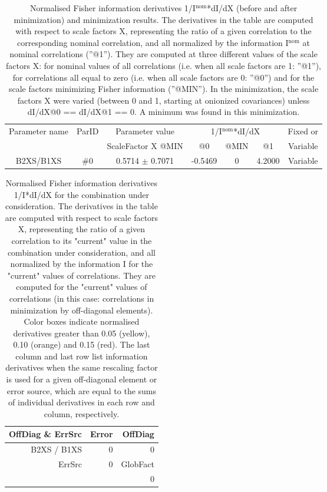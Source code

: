 \begin{table}[H]
\scriptsize
\begin{center}
\renewcommand{\arraystretch}{1.1}
\begin{tabular}{|c|c|c|ccc|c|}
\hline
Parameter name & ParID & Parameter value &\multicolumn{3}{|c|}{1/I$^\mathrm{nom}$*dI/dX} & Fixed or\\
 & & ScaleFactor X @MIN & @0 & @MIN & @1 & Variable\\
\hline
 {\tiny B2XS/B1XS} & \#0 &    0.5714 $\pm$    0.7071 &   -0.5469 & 0 &    4.2000 & Variable \\
\hline
\end{tabular}
\renewcommand{\arraystretch}{1}
\caption{Normalised Fisher information derivatives 1/I$^\mathrm{nom}$*dI/dX (before and after minimization) and minimization results.  The derivatives in the table are computed with respect to scale factors X, representing the ratio of a given correlation to the corresponding nominal correlation, and all normalized by the information I$^\mathrm{nom}$ at nominal correlations (''@1''). They are computed at three different values of the scale factors X: for nominal values of all correlations (i.e. when all scale factors are 1: ''@1''), for correlations all equal to zero (i.e. when all scale factors are 0: ''@0'') and for the scale factors minimizing Fisher information (''@MIN''). In the minimization, the scale factors X were varied (between 0 and 1, starting at onionized covariances) unless dI/dX@0 == dI/dX@1 == 0. A minimum was found in this minimization.}
\end{center}
\end{table}
\begin{table}[H]
\scriptsize
\begin{center}
\renewcommand{\arraystretch}{1.1}
\begin{tabular}{|r|r|r|}
\hline
 OffDiag \& ErrSrc & {\tiny Error} & OffDiag\\
\hline
B2XS / B1XS &  0 &  0 \\
\hline
\multirow{2}{*}{ErrSrc} & \multirow{2}{*}{ 0} & GlobFact\\
 & &  0 \\
\hline
\end{tabular}
\renewcommand{\arraystretch}{1}
\caption{Normalised Fisher information derivatives 1/I*dI/dX for the combination under consideration. The derivatives in the table are computed with respect to scale factors X, representing the ratio of a given correlation to its "current" value in the combination under consideration, and all normalized by the information I for the "current" values of correlations. They are computed for the "current" values of correlations (in this case: correlations in minimization by off-diagonal elements). Color boxes indicate normalised derivatives greater than 0.05 (yellow), 0.10 (orange) and 0.15 (red). The last column and last row list information derivatives when the same rescaling factor is used for a given off-diagonal element or error source, which are equal to the sums of individual derivatives in each row and column, respectively.}
\end{center}
\end{table}
